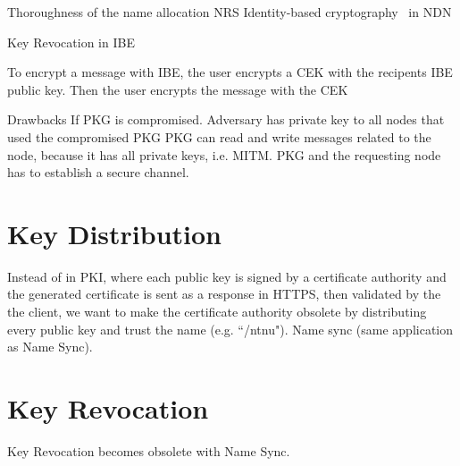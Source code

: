 
Thoroughness of the name allocation \gls{NRS} 
Identity-based cryptography~\cite{DBLP:conf/icnp/ZhangCXWSW11} in \gls{NDN}

Key Revocation in IBE ~\cite{DBLP:journals/iacr/BoldyrevaGK12} 

To encrypt a message with \gls{IBE}, the user encrypts a \gls{CEK} with the recipents \gls{IBE} public key.
Then the user encrypts the message with the \gls{CEK}~\cite[section 2.2.2]{rfc5408}

Drawbacks
If \gls{PKG} is compromised. Adversary has private key to all nodes that used the compromised \gls{PKG}
\gls{PKG} can read and write messages related to the node, because it has all private keys, i.e. \gls{MITM}.
\gls{PKG} and the requesting node has to establish a secure channel. 


\section{Key Distribution}
Instead of in \gls{PKI}, where each public key is signed by a certificate authority and the generated certificate is sent as a response in \gls{HTTPS}, then validated by the the client, we want to make the certificate authority obsolete by distributing every public key and trust the name (e.g. ``/ntnu"). 
Name sync (same application as Name Sync).

\section{Key Revocation}
Key Revocation becomes obsolete with Name Sync. 
